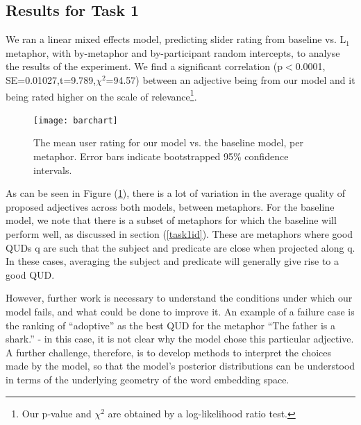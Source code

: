 \documentclass[10pt,letterpaper,twocolumn]{article}
\begin{document}
\subsection{Results for Task 1}


We ran a linear mixed effects model, predicting slider rating from baseline vs. L$_1$ metaphor, with by-metaphor and by-participant random intercepts, to analyse the results of the experiment. We find a significant correlation (p$<$0.0001, SE=0.01027,t=9.789,$\chi^2$=94.57) between an adjective being from our model and it being rated higher on the scale of relevance\footnote{Our p-value and $\chi^2$ are obtained by a log-likelihood ratio test.}.


\begin{figure} \label{resultsbar}
\centerline{\texttt{[image: barchart]}}
\caption{The mean user rating for our model vs. the baseline model, per metaphor. Error bars indicate bootstrapped 95\% confidence intervals.} 
\end{figure}

As can be seen in Figure (\ref{resultsbar}), there is a lot of variation in the average quality of proposed adjectives across both models, between metaphors. For the baseline model, we note that there is a subset of metaphors for which the baseline will perform well, as discussed in section (\ref{task1id}). These are metaphors where good QUDs q are such that the subject and predicate are close when projected along q. In these cases, averaging the subject and predicate will generally give rise to a good QUD. 

However, further work is necessary to understand the conditions under which our model fails, and what could be done to improve it. An example of a failure case is the ranking of ``adoptive'' as the best QUD for the metaphor ``The father is a shark.'' - in this case, it is not clear why the model chose this particular adjective. A further challenge, therefore, is to develop methods to interpret the choices made by the model, so that the model's posterior distributions can be understood in terms of the underlying geometry of the word embedding space.



\end{document}
